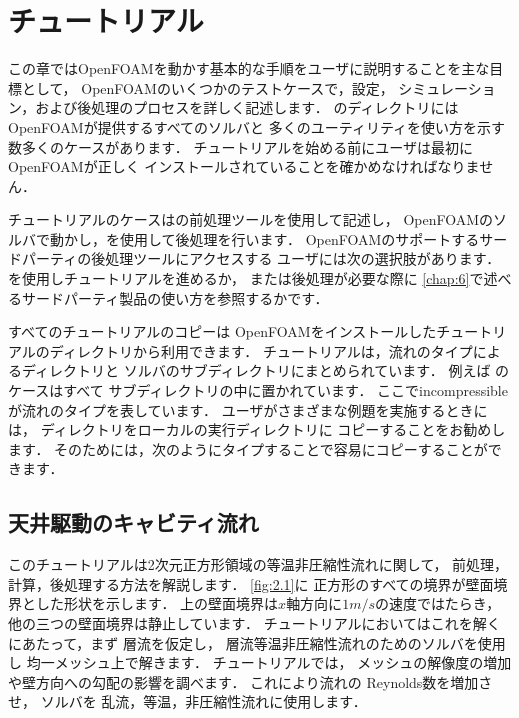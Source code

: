 \chapter{チュートリアル}
\label{chap:2}
この章ではOpenFOAMを動かす基本的な手順をユーザに説明することを主な目標として，
OpenFOAMのいくつかのテストケースで，設定，
シミュレーション，および後処理のプロセスを詳しく記述します．
のディレクトリには
OpenFOAMが提供するすべてのソルバと
多くのユーティリティを使い方を示す数多くのケースがあります．
チュートリアルを始める前にユーザは最初にOpenFOAMが正しく
インストールされていることを確かめなければなりません．

チュートリアルのケースはの前処理ツールを使用して記述し，
OpenFOAMのソルバで動かし，を使用して後処理を行います．
OpenFOAMのサポートするサードパーティの後処理ツールにアクセスする
ユーザには次の選択肢があります．
を使用しチュートリアルを進めるか，
または後処理が必要な際に
\autoref{chap:6}で述べるサードパーティ製品の使い方を参照するかです．

すべてのチュートリアルのコピーは
OpenFOAMをインストールしたチュートリアルのディレクトリから利用できます．
チュートリアルは，流れのタイプによるディレクトリと
ソルバのサブディレクトリにまとめられています．
例えば
%
%
のケースはすべて
サブディレクトリの中に置かれています．
ここでincompressibleが流れのタイプを表しています．
ユーザがさまざまな例題を実施するときには，
%
%
ディレクトリをローカルの実行ディレクトリに
コピーすることをお勧めします．
そのためには，次のようにタイプすることで容易にコピーすることができます．



\section{天井駆動のキャビティ流れ}
\label{sec:2.1}
%
%
%
このチュートリアルは2次元正方形領域の等温非圧縮性流れに関して，
前処理，計算，後処理する方法を解説します．
\autoref{fig:2.1}に
正方形のすべての境界が壁面境界とした形状を示します．
上の壁面境界は$x$軸方向に$1\unit{m/s}$の速度ではたらき，
他の三つの壁面境界は静止しています．
チュートリアルにおいてはこれを解くにあたって，まず
%
層流を仮定し，
層流等温非圧縮性流れのためのソルバを使用し
均一メッシュ上で解きます．
チュートリアルでは，
メッシュの解像度の増加や壁方向への勾配の影響を調べます．
これにより流れの
%
Reynolds数を増加させ，
%
%
ソルバを
%
乱流，等温，非圧縮性流れに使用します．


